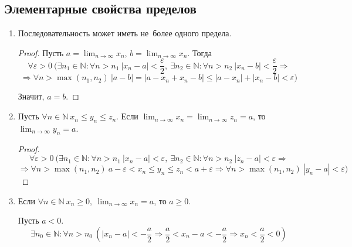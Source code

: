 \subsection{Элементарные свойства пределов}
\begin{enumerate}
	\item Последовательность может иметь не~более одного предела.
	\begin{proof}
	Пусть $\displaystyle a = \lim_{n \to \infty} x_n$, $\displaystyle b = \lim_{n \to \infty} x_n$.
	Тогда
	\begin{equation*}
	\forall \varepsilon > 0 \ (\exists n_1 \in \mathbb N \colon \forall n > n_1 \ |x_n - a| < \frac\varepsilon2, \ \exists n_2 \in \mathbb N \colon \forall n > n_2 \ |x_n - b| < \frac\varepsilon2 \Rightarrow
	\end{equation*}
	\begin{equation*}
	\Rightarrow \forall n > \max(n_1, n_2) \ |a - b| = |a - x_n + x_n - b| \leqslant |a - x_n| + |x_n - b| < \varepsilon)
	\end{equation*}
	
	Значит, $a = b$.
	\end{proof}
	
	\item \begin{theorem}
	Пусть $\forall n \in \mathbb N \ x_n \leqslant y_n \leqslant z_n$. Если $\displaystyle \lim_{n \to \infty} x_n = \lim_{n \to \infty} z_n = a$, то $\displaystyle \lim_{n \to \infty} y_n = a$.
	\end{theorem}
	\begin{proof}
	\begin{equation*}
	\forall \varepsilon > 0 \ (\exists n_1 \in \mathbb N \colon \forall n > n_1 \ |x_n - a| < \varepsilon, \ \exists n_2 \in \mathbb N \colon \forall n > n_2 \ |z_n - a| < \varepsilon \Rightarrow
	\end{equation*}
	\begin{equation*}
	\Rightarrow \forall n > \max(n_1, n_2) \ a - \varepsilon < x_n \leqslant y_n \leqslant z_n < a + \varepsilon \Rightarrow \forall n > \max(n_1, n_2) \  |y_n - a| < \varepsilon)
	\end{equation*}
	\end{proof}
	
	\item Если $\displaystyle \forall n \in \mathbb N \ x_n \geqslant 0, \ \lim_{n \to \infty} x_n = a$, то $a \geqslant 0$.
	\begin{proofcontra}
	Пусть $a < 0$.
	\begin{equation*}
	\exists n_0 \in \mathbb N \colon \forall n > n_0 \ \left( |x_n - a| < -\frac{a}2 \Rightarrow
	\frac{a}2 < x_n - a < -\frac{a}2 \Rightarrow x_n < \frac{a}2 < 0 \right)
	\end{equation*}
	

\end{proofcontra}
\end{enumerate}
